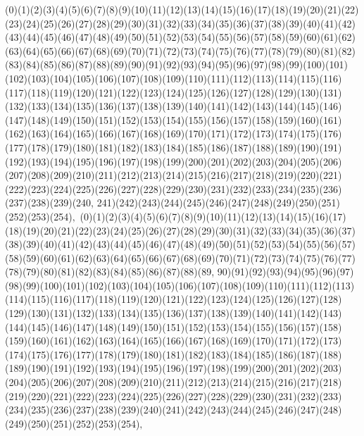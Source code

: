 \documentclass[12pt]{article}
\begin{document}
{(0)(1)(2)(3)(4)(5)(6)(7)(8)(9)(10)(11)(12)(13)(14)(15)(16)(17)(18)(19)(20)(21)(22)(23)(24)(25)(26)(27)(28)(29)(30)(31)(32)(33)(34)(35)(36)(37)(38)(39)(40)(41)(42)(43)(44)(45)(46)(47)(48)(49)(50)(51)(52)(53)(54)(55)(56)(57)(58)(59)(60)(61)(62)(63)(64)(65)(66)(67)(68)(69)(70)(71)(72)(73)(74)(75)(76)(77)(78)(79)(80)(81)(82)(83)(84)(85)(86)(87)(88)(89)(90)(91)(92)(93)(94)(95)(96)(97)(98)(99)(100)(101)(102)(103)(104)(105)(106)(107)(108)(109)(110)(111)(112)(113)(114)(115)(116)(117)(118)(119)(120)(121)(122)(123)(124)(125)(126)(127)(128)(129)(130)(131)(132)(133)(134)(135)(136)(137)(138)(139)(140)(141)(142)(143)(144)(145)(146)(147)(148)(149)(150)(151)(152)(153)(154)(155)(156)(157)(158)(159)(160)(161)(162)(163)(164)(165)(166)(167)(168)(169)(170)(171)(172)(173)(174)(175)(176)(177)(178)(179)(180)(181)(182)(183)(184)(185)(186)(187)(188)(189)(190)(191)(192)(193)(194)(195)(196)(197)(198)(199)(200)(201)(202)(203)(204)(205)(206)(207)(208)(209)(210)(211)(212)(213)(214)(215)(216)(217)(218)(219)(220)(221)(222)(223)(224)(225)(226)(227)(228)(229)(230)(231)(232)(233)(234)(235)(236)(237)(238)(239)(240, 241)(242)(243)(244)(245)(246)(247)(248)(249)(250)(251)(252)(253)(254)$
, 
$
(0)(1)(2)(3)(4)(5)(6)(7)(8)(9)(10)(11)(12)(13)(14)(15)(16)(17)(18)(19)(20)(21)(22)(23)(24)(25)(26)(27)(28)(29)(30)(31)(32)(33)(34)(35)(36)(37)(38)(39)(40)(41)(42)(43)(44)(45)(46)(47)(48)(49)(50)(51)(52)(53)(54)(55)(56)(57)(58)(59)(60)(61)(62)(63)(64)(65)(66)(67)(68)(69)(70)(71)(72)(73)(74)(75)(76)(77)(78)(79)(80)(81)(82)(83)(84)(85)(86)(87)(88)(89, 90)(91)(92)(93)(94)(95)(96)(97)(98)(99)(100)(101)(102)(103)(104)(105)(106)(107)(108)(109)(110)(111)(112)(113)(114)(115)(116)(117)(118)(119)(120)(121)(122)(123)(124)(125)(126)(127)(128)(129)(130)(131)(132)(133)(134)(135)(136)(137)(138)(139)(140)(141)(142)(143)(144)(145)(146)(147)(148)(149)(150)(151)(152)(153)(154)(155)(156)(157)(158)(159)(160)(161)(162)(163)(164)(165)(166)(167)(168)(169)(170)(171)(172)(173)(174)(175)(176)(177)(178)(179)(180)(181)(182)(183)(184)(185)(186)(187)(188)(189)(190)(191)(192)(193)(194)(195)(196)(197)(198)(199)(200)(201)(202)(203)(204)(205)(206)(207)(208)(209)(210)(211)(212)(213)(214)(215)(216)(217)(218)(219)(220)(221)(222)(223)(224)(225)(226)(227)(228)(229)(230)(231)(232)(233)(234)(235)(236)(237)(238)(239)(240)(241)(242)(243)(244)(245)(246)(247)(248)(249)(250)(251)(252)(253)(254)$
, 
$
}
\end{document}
